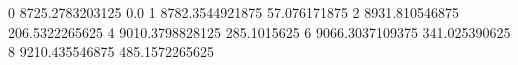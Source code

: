 0 8725.2783203125 0.0
1 8782.3544921875 57.076171875
2 8931.810546875 206.5322265625
4 9010.3798828125 285.1015625
6 9066.3037109375 341.025390625
8 9210.435546875 485.1572265625
